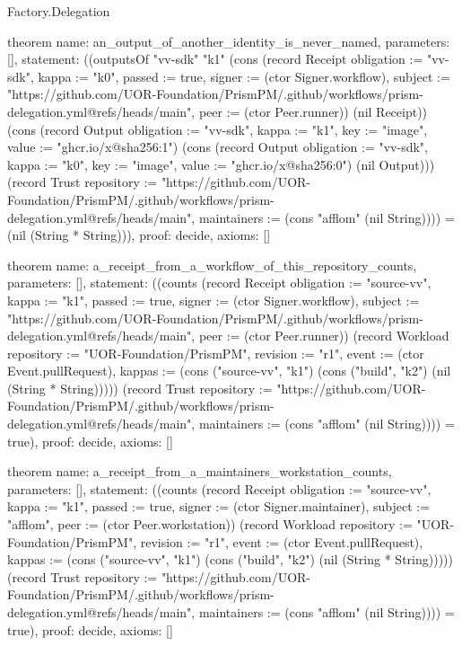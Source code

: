 \begin{lexlean}{Factory.Delegation}
\begin{semanticmodule}
theorem{
  name: an_output_of_another_identity_is_never_named,
  parameters: [],
  statement: ((outputsOf "vv-sdk" "k1" (cons (record Receipt {obligation := "vv-sdk", kappa := "k0", passed := true, signer := (ctor Signer.workflow), subject := "https://github.com/UOR-Foundation/PrismPM/.github/workflows/prism-delegation.yml@refs/heads/main", peer := (ctor Peer.runner)}) (nil Receipt)) (cons (record Output {obligation := "vv-sdk", kappa := "k1", key := "image", value := "ghcr.io/x@sha256:1"}) (cons (record Output {obligation := "vv-sdk", kappa := "k0", key := "image", value := "ghcr.io/x@sha256:0"}) (nil Output))) (record Trust {repository := "https://github.com/UOR-Foundation/PrismPM/.github/workflows/prism-delegation.yml@refs/heads/main", maintainers := (cons "afflom" (nil String))})) = (nil (String * String))),
  proof: decide{},
  axioms: []
}

theorem{
  name: a_receipt_from_a_workflow_of_this_repository_counts,
  parameters: [],
  statement: ((counts (record Receipt {obligation := "source-vv", kappa := "k1", passed := true, signer := (ctor Signer.workflow), subject := "https://github.com/UOR-Foundation/PrismPM/.github/workflows/prism-delegation.yml@refs/heads/main", peer := (ctor Peer.runner)}) (record Workload {repository := "UOR-Foundation/PrismPM", revision := "r1", event := (ctor Event.pullRequest), kappas := (cons ("source-vv", "k1") (cons ("build", "k2") (nil (String * String))))}) (record Trust {repository := "https://github.com/UOR-Foundation/PrismPM/.github/workflows/prism-delegation.yml@refs/heads/main", maintainers := (cons "afflom" (nil String))})) = true),
  proof: decide{},
  axioms: []
}

theorem{
  name: a_receipt_from_a_maintainers_workstation_counts,
  parameters: [],
  statement: ((counts (record Receipt {obligation := "source-vv", kappa := "k1", passed := true, signer := (ctor Signer.maintainer), subject := "afflom", peer := (ctor Peer.workstation)}) (record Workload {repository := "UOR-Foundation/PrismPM", revision := "r1", event := (ctor Event.pullRequest), kappas := (cons ("source-vv", "k1") (cons ("build", "k2") (nil (String * String))))}) (record Trust {repository := "https://github.com/UOR-Foundation/PrismPM/.github/workflows/prism-delegation.yml@refs/heads/main", maintainers := (cons "afflom" (nil String))})) = true),
  proof: decide{},
  axioms: []
}


\end{semanticmodule}
\end{lexlean}
